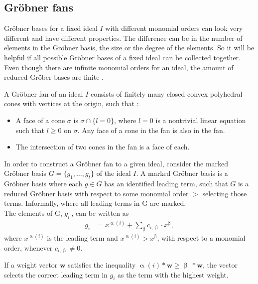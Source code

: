 \subsection{Gröbner fans}
\label{subsec:Groebnerfan}
 Gröbner bases for a fixed ideal $I$ with different monomial orders can look very different and have different properties. The difference can be in the number of elements in the Gröbner basis, the size or the degree of the elements. So it will be helpful if all 
possible Gröbner bases of a fixed ideal can be collected together.\\
Even though there are infinite monomial orders for an ideal, the amount of reduced Gröber bases are finite \cite{coxOshea}. 
 
\begin{env_definition}
\cite{coxOshea} A Gröbner fan of an ideal $I$ consists of finitely many closed convex polyhedral cones with vertices at the origin, such that :

\begin{itemize}
\item
A face of a cone $\sigma$ is $\sigma \cap \lbrace l=0\rbrace$, where $l=0$ is a nontrivial linear equation such that $l \geq 0$ on $\sigma$.
Any face of a cone in the fan is also in the fan.
\item
The intersection of two cones in the fan is a face of each.
\end{itemize}

\end{env_definition}

In order to construct a Gröbner fan to a given ideal, consider the marked Gröbner basis $G = \lbrace g_{1},\dots,g_{t}\rbrace $ of the ideal $I$.
A marked Gröbner basis is a Gröbner basis where each $g \in G$ has an identified leading term, such that $G$ is a reduced Gröbner basis with respect to some monomial order $>$ selecting those terms.
Informally, where all leading terms in G are marked.\\
\newline
The elements of G, $g_{i}~$, can be written as
\begin{align*}
 g_{i} &  = x^{\upalpha\left( i\right) } +  \sum_{\upbeta} c_{i,\upbeta} \cdot x^{\upbeta}, 
\end{align*}
where $ x^{\upalpha\left( i\right) }$ is the leading term and $ x^{\upalpha\left( i\right) } > x^{\upbeta} $, with respect to a monomial order, whenever $c_{i,\upbeta} \neq 0 $.

If a weight vector $\textbf{w}$ satisfies the inequality
$\upalpha\left( i\right) \ast \textbf{w} \geq \upbeta~\ast\textbf{w}$, the vector selects the correct leading term in $g_{i}$ as the term with the highest weight.\\

